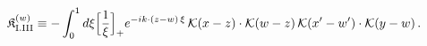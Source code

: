 \begingroup\small
\begin{align}\label{eq:K-w_rm_I_III}
&\mathfrak{K}^{(w)}_{\rm I.III}\equiv - \int_{0}^{1}d\xi\Big[\frac{1}{\xi}\Big]_{+}e^{-ik\cdot(z-w)\,\xi}\, \mathcal{K}(x-z)\cdot\mathcal{K}(w-z)\, \mathcal{K}(x'-w')\cdot\mathcal{K}(y-w)\,.
\end{align}
\endgroup

